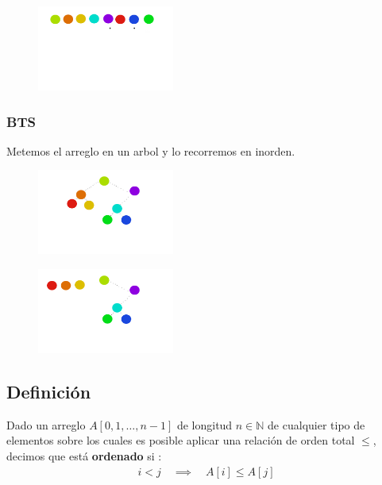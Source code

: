 \documentclass[12pt, fleqn]{report}                             %
\theoremstyle{break}                                            %
\begin{document}
    	\begin{figure}[h]
                        \centering
                        \includegraphics[width=0.4\textwidth]{graphics/Shell5.png}
                    \end{figure}
                     \clearpage
    	\subsubsection{BTS}
    	Metemos el arreglo en un arbol y lo recorremos en inorden.
    	\begin{figure}[h]
                        \centering
                        \includegraphics[width=0.4\textwidth]{graphics/Arbol-1.png}
                    \end{figure}
    	\begin{figure}[h]
                        \centering
                        \includegraphics[width=0.4\textwidth]{graphics/Arbol-2.png}
                    \end{figure}
                     \clearpage
    	
        
    	\subsection{Definición}
    	
    	
    	    Dado un arreglo $A[0, 1, \ldots, n-1]$ de longitud $n \in \mathbb{N}$ de cualquier tipo de elementos sobre los cuales es posible aplicar una relación de orden total $\leq$, decimos que está \textbf{ordenado} si \cite{ref1}:
    	    \begin{align*}
    	        i < j \quad \implies \quad A[i] \leq A[j]
    	    \end{align*}
    	    
\end{document}
